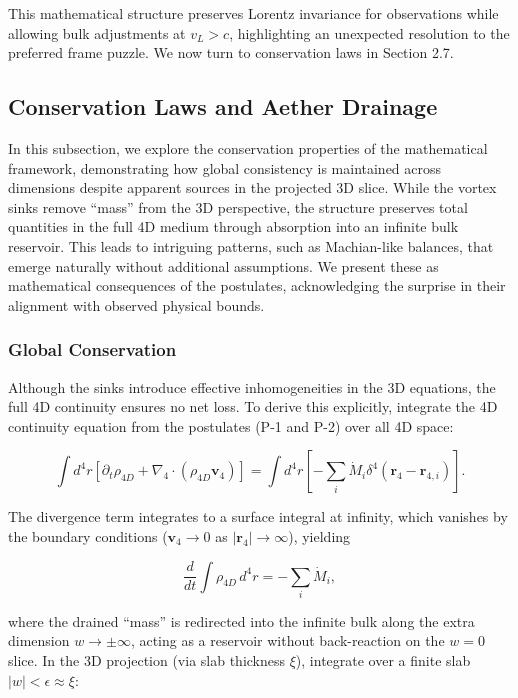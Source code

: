 This mathematical structure preserves Lorentz invariance for observations while allowing bulk adjustments at $v_L > c$, highlighting an unexpected resolution to the preferred frame puzzle. We now turn to conservation laws in Section 2.7.

\subsection{Conservation Laws and Aether Drainage}

In this subsection, we explore the conservation properties of the mathematical framework, demonstrating how global consistency is maintained across dimensions despite apparent sources in the projected 3D slice. While the vortex sinks remove ``mass'' from the 3D perspective, the structure preserves total quantities in the full 4D medium through absorption into an infinite bulk reservoir. This leads to intriguing patterns, such as Machian-like balances, that emerge naturally without additional assumptions. We present these as mathematical consequences of the postulates, acknowledging the surprise in their alignment with observed physical bounds.

\subsubsection{Global Conservation}
Although the sinks introduce effective inhomogeneities in the 3D equations, the full 4D continuity ensures no net loss. To derive this explicitly, integrate the 4D continuity equation from the postulates (P-1 and P-2) over all 4D space:

\[
\int d^4 r \left[ \partial_t \rho_{4D} + \nabla_4 \cdot (\rho_{4D} \mathbf{v}_4) \right] = \int d^4 r \left[ -\sum_i \dot{M}_i \delta^4(\mathbf{r}_4 - \mathbf{r}_{4,i}) \right].
\]

The divergence term integrates to a surface integral at infinity, which vanishes by the boundary conditions ($\mathbf{v}_4 \to 0$ as $|\mathbf{r}_4| \to \infty$), yielding

\begin{equation}
\frac{d}{dt} \int \rho_{4D} \, d^4 r = -\sum_i \dot{M}_i,
\end{equation}

where the drained ``mass'' is redirected into the infinite bulk along the extra dimension $w \to \pm \infty$, acting as a reservoir without back-reaction on the $w=0$ slice. In the 3D projection (via slab thickness $\xi$), integrate over a finite slab $|w| < \epsilon \approx \xi$:

